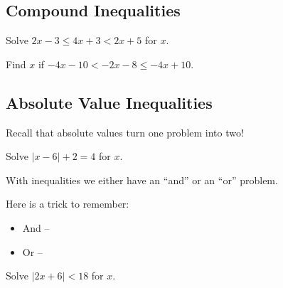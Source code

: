 \subsection{Compound Inequalities}

\begin{exercise}
Solve $2x-3\leq4x+3<2x+5$ for $x$.
\end{exercise}
\begin{solution}[2in]

\end{solution}
\vspace{0.5em}

\begin{exercise}
Find $x$ if $-4x-10<-2x-8\leq-4x+10$.
\end{exercise}
\begin{solution}[2in]

\end{solution}
\vspace{0.5em}

\newpage

\subsection{Absolute Value Inequalities}

Recall that absolute values turn one problem into two!

\begin{exercise}
Solve $\vert x-6\vert+2=4$ for $x$.
\end{exercise}
\begin{solution}[2in]

\end{solution}
\vspace{0.5em}

With inequalities we either have an ``and'' or an ``or'' problem.

\begin{note}
Here is a trick to remember:
\begin{itemize}
    \item And --  
    \item Or -- 
\end{itemize}
\end{note}

\begin{exercise}
Solve $\vert2x+6\vert<18$ for $x$.
\end{exercise}
\begin{solution}[2in]

\end{solution}
\vspace{0.5em}

